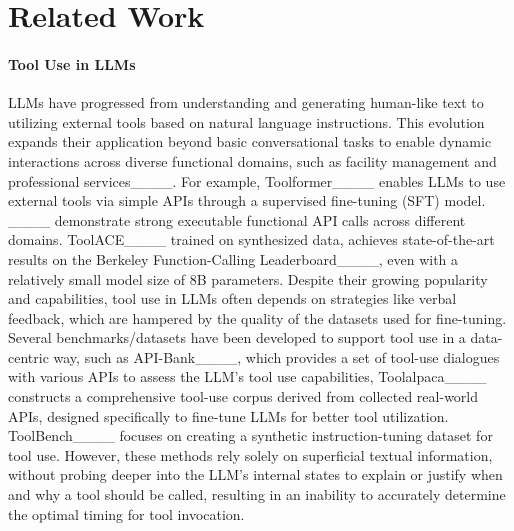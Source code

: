 \section{Related Work}
\paragraph{Tool Use in LLMs}
LLMs have progressed from understanding and generating human-like text to utilizing external tools based on natural language instructions. This evolution expands their application beyond basic conversational tasks to enable dynamic interactions across diverse functional domains, such as facility management and professional services____. For example, Toolformer____ enables LLMs to use external tools via simple APIs through a supervised fine-tuning (SFT) model. ____ demonstrate strong executable functional API calls across different domains. ToolACE____ trained on synthesized data, achieves state-of-the-art results on the Berkeley Function-Calling Leaderboard____, even with a relatively small model size of 8B parameters. Despite their growing popularity and capabilities, tool use in LLMs often depends on strategies like verbal feedback, which are hampered by the quality of the datasets used for fine-tuning. Several benchmarks/datasets have been developed to support tool use in a data-centric way, such as API-Bank____, which provides a set of tool-use dialogues with various APIs to assess the LLM's tool use capabilities, Toolalpaca____ constructs a comprehensive tool-use corpus derived from collected real-world APIs, designed specifically to fine-tune LLMs for better tool utilization. ToolBench____ focuses on creating a synthetic instruction-tuning dataset for tool use. However, these methods rely solely on superficial textual information, without probing deeper into the LLM’s internal states to explain or justify when and why a tool should be called, resulting in an inability to accurately determine the optimal timing for tool invocation.

